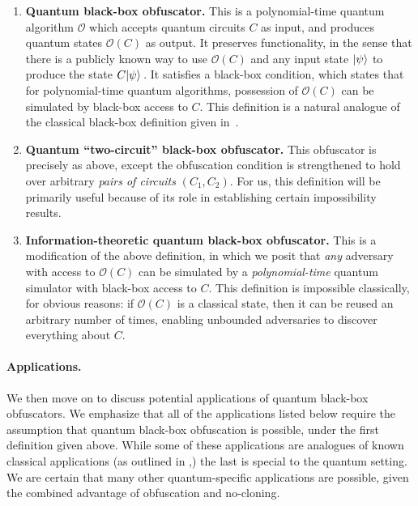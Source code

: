 \documentclass[11pt]{article}
\numberwithin{equation}{section}
\newcommand{\algo}{\mathcal}
\begin{document}
{\begin{enumerate}
\item \textbf{Quantum black-box obfuscator.} This is a polynomial-time quantum algorithm $\algo O$ which accepts quantum circuits $C$ as input, and produces quantum states $\algo O(C)$ as output. It preserves functionality, in the sense that there is a publicly known way to use $\algo O(C)$ and any input state ${\left\vert{\psi}\right\rangle}$ to produce the state $C {\left\vert{\psi}\right\rangle}$\,. It satisfies a black-box condition, which states that for polynomial-time quantum algorithms, possession of $\algo O(C)$ can be simulated by black-box access to $C$. This definition is a natural analogue of the classical black-box definition given in~\cite{BGIRSVY12}.
\item \textbf{Quantum ``two-circuit'' black-box obfuscator.} This obfuscator is precisely as above, except the obfuscation condition is strengthened to hold over arbitrary \emph{pairs of circuits} $(C_1, C_2)$. For us, this definition will be primarily useful because of its role in establishing certain impossibility results.
\item \textbf{Information-theoretic quantum black-box obfuscator.} This is a modification of the above definition, in which we posit that \emph{any} adversary with access to $\algo O(C)$ can be simulated by a \emph{polynomial-time} quantum simulator with black-box access to $C$. This definition is impossible classically, for obvious reasons: if $\algo O(C)$ is a classical state, then it can be reused an arbitrary number of times, enabling unbounded adversaries to discover everything about $C$.
\end{enumerate}

\paragraph{Applications.} We then move on to discuss potential applications of quantum black-box obfuscators. We emphasize that all of the applications listed below require the assumption that quantum black-box obfuscation is possible, under the first definition given above. While some of these applications are analogues of known classical applications (as outlined in \cite{BGIRSVY12},) the last is special to the quantum setting. We are certain that many other quantum-specific applications are possible, given the combined advantage of obfuscation and no-cloning.

}
\end{document}

